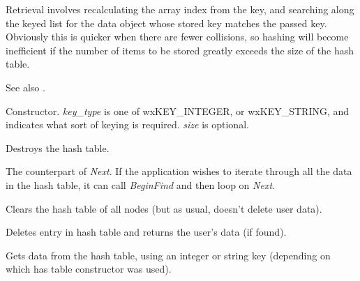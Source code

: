 Retrieval involves recalculating the array index from the key, and searching
along the keyed list for the data object whose stored key matches the passed
key. Obviously this is quicker when there are fewer collisions, so hashing
will become inefficient if the number of items to be stored greatly exceeds
the size of the hash table.

See also .



Constructor. {\it key\_type} is one of wxKEY\_INTEGER, or wxKEY\_STRING,
and indicates what sort of keying is required. {\it size} is optional.



Destroys the hash table.



The counterpart of {\it Next}.  If the application wishes to iterate
through all the data in the hash table, it can call {\it BeginFind} and
then loop on {\it Next}.



Clears the hash table of all nodes (but as usual, doesn't delete user data).




Deletes entry in hash table and returns the user's data (if found).




Gets data from the hash table, using an integer or string key (depending on which
has table constructor was used).



